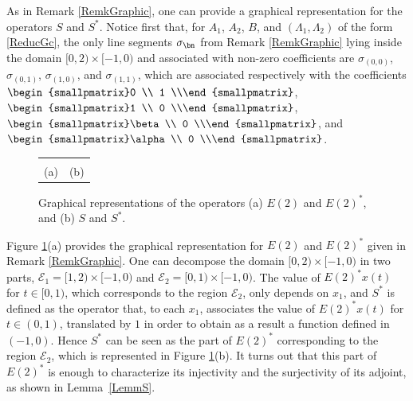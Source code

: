 \begin{remk}
\label{RemkGraphicSSAst}
As in Remark \ref{RemkGraphic}, one can provide a graphical representation for the operators $S$ and $S^\ast$. Notice first that, for $A_1$, $A_2$, $B$, and $(\Lambda_1, \Lambda_2)$ of the form \eqref{ReducGc}, the only line segments $\sigma_{\bn}$ from Remark \ref{RemkGraphic} lying inside the domain $[0, 2) \times [-1, 0)$ and associated with non-zero coefficients are $\sigma_{(0, 0)}$, $\sigma_{(0, 1)}$, $\sigma_{(1, 0)}$, and $\sigma_{(1, 1)}$, which are associated respectively with the coefficients $\begin{smallpmatrix}0 \\ 1 \\\end{smallpmatrix}$, $\begin{smallpmatrix}1 \\ 0 \\\end{smallpmatrix}$, $\begin{smallpmatrix}\beta \\ 0 \\\end{smallpmatrix}$, and $\begin{smallpmatrix}\alpha \\ 0 \\\end{smallpmatrix}$.

\newlength{\OneLine}
\setlength{\OneLine}{\baselineskip}

\begin{figure}[ht]
\centering
\begin{tabular}{@{} c @{} c @{}}
\raisebox{-\height+\OneLine}{} & \raisebox{-\height + \OneLine}{} \tabularnewline
(a) & (b) \tabularnewline
\end{tabular}
\caption{Graphical representations of the operators (a) $E(2)$ and $E(2)^\ast$, and (b) $S$ and $S^\ast$.}
\label{FigET2-S}
\end{figure}

Figure \ref{FigET2-S}(a) provides the graphical representation for $E(2)$ and $E(2)^\ast$ given in Remark \ref{RemkGraphic}. One can decompose the domain $[0, 2) \times [-1, 0)$ in two parts, $\mathcal E_1 = [1, 2) \times [-1, 0)$ and $\mathcal E_2 = [0, 1) \times [-1, 0)$. The value of $E(2)^\ast x(t)$ for $t \in [0, 1)$, which corresponds to the region $\mathcal E_2$, only depends on $x_1$, and $S^\ast$ is defined as the operator that, to each $x_1$, associates the value of $E(2)^\ast x(t)$ for $t \in (0, 1)$, translated by $1$ in order to obtain as a result a function defined in $(-1, 0)$. Hence $S^\ast$ can be seen as the part of $E(2)^\ast$ corresponding to the region $\mathcal E_2$, which is represented in Figure \ref{FigET2-S}(b). It turns out that this part of $E(2)^\ast$ is enough to characterize its injectivity and the surjectivity of its adjoint, as shown in Lemma~\ref{LemmS}.


\end{remk}
